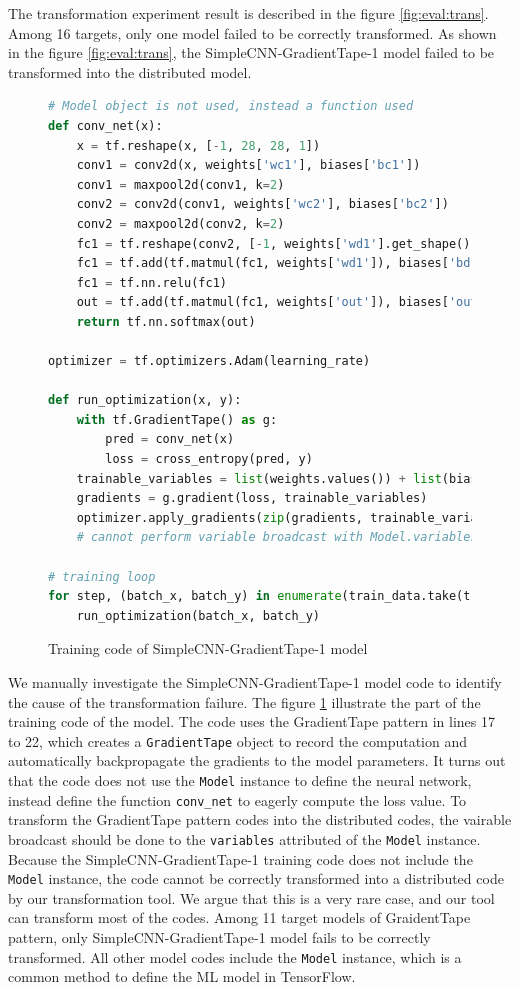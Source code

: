 The transformation experiment result is described in the 
figure \ref{fig:eval:trans}. Among 16 targets, only one model failed to
be correctly transformed. As shown in the figure \ref{fig:eval:trans},
the SimpleCNN-GradientTape-1 model failed to be transformed into the
distributed model.

\begin{figure}[!ht]
  \begin{lstlisting}[language=Python]
# Model object is not used, instead a function used
def conv_net(x):
    x = tf.reshape(x, [-1, 28, 28, 1])
    conv1 = conv2d(x, weights['wc1'], biases['bc1'])
    conv1 = maxpool2d(conv1, k=2)
    conv2 = conv2d(conv1, weights['wc2'], biases['bc2'])
    conv2 = maxpool2d(conv2, k=2)
    fc1 = tf.reshape(conv2, [-1, weights['wd1'].get_shape().as_list()[0]])
    fc1 = tf.add(tf.matmul(fc1, weights['wd1']), biases['bd1'])
    fc1 = tf.nn.relu(fc1)
    out = tf.add(tf.matmul(fc1, weights['out']), biases['out'])
    return tf.nn.softmax(out)

optimizer = tf.optimizers.Adam(learning_rate)

def run_optimization(x, y):
    with tf.GradientTape() as g:
        pred = conv_net(x)
        loss = cross_entropy(pred, y) 
    trainable_variables = list(weights.values()) + list(biases.values())
    gradients = g.gradient(loss, trainable_variables)
    optimizer.apply_gradients(zip(gradients, trainable_variables))
    # cannot perform variable broadcast with Model.variables

# training loop
for step, (batch_x, batch_y) in enumerate(train_data.take(training_steps), 1):
    run_optimization(batch_x, batch_y)
  \end{lstlisting}
  \caption{Training code of SimpleCNN-GradientTape-1 model}
  \label{fig:eval:simplecnn1}
\end{figure}

We manually investigate the SimpleCNN-GradientTape-1 model code to 
identify the cause of the transformation failure.
The figure \ref{fig:eval:simplecnn1} illustrate the part of the training code
of the model.
The code uses the GradientTape pattern in lines 17 to 22, which
creates a {\tt GradientTape} object to record the computation
and automatically backpropagate the gradients to the model parameters.
It turns out that the code does not use the {\tt Model} instance to
define the neural network, instead define the function {\tt conv\_net} 
to eagerly compute the loss value.
To transform the GradientTape pattern codes into the distributed codes,
the vairable broadcast should be done to the {\tt variables} attributed of
the {\tt Model} instance. Because the SimpleCNN-GradientTape-1 training code
does not include the {\tt Model} instance, the code cannot be correctly
transformed into a distributed code by our transformation tool.
We argue that this is a very rare case, and our tool can transform most of the
codes. Among 11 target models of GraidentTape pattern, only
SimpleCNN-GradientTape-1 model fails to be correctly transformed.
All other model codes include the {\tt Model} instance, 
which is a common method to define the ML model in TensorFlow. 

